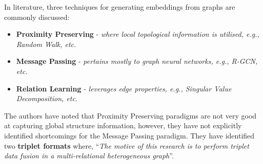 \begin{sloppypar*}
    In literature, three techniques for generating embeddings from graphs are
    commonly discussed:
    \begin{itemize}
        \item \textbf{Proximity Preserving} - \textit{where local topological information
            is utilised, e.g., Random Walk, etc.}
        \item \textbf{Message Passing} - \textit{pertains mostly to graph neural
            networks, e.g., R-GCN, etc.}
        \item \textbf{Relation Learning} - \textit{leverages edge properties, e.g.,
            Singular Value Decomposition, etc.}
    \end{itemize}

    \noindent The authors have noted that Proximity Preserving paradigms are not
    very good at capturing global structure information, however, they have not
    explicitly identified shortcomings for the Message Passing paradigm. They have
    identified two \textbf{triplet formats} where, ``\textit{The motive of this
    research is to perform triplet data fusion in a multi-relational heterogeneous
    graph}''.
\end{sloppypar*}